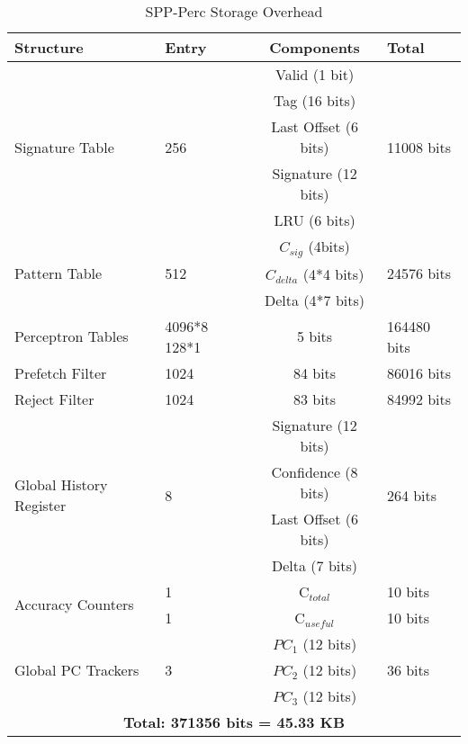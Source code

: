 \begin{table}[]
    \centering
    \begin{tabular}{|p{1.5cm}|p{1cm}|c|p{1.5cm}|}
    \hline
        \textbf{Structure} &
        \textbf{Entry} &
        \textbf{Components} &
        \textbf{Total} \\
    \hline
        \multirow{5}{1.5cm}{Signature Table} & \multirow{5}{1.5cm}{256} & Valid (1 bit) & \multirow{5}{1cm}{11008  bits}\\
        & & Tag (16 bits) &\\
        & & Last Offset (6 bits) &\\  
        & & Signature (12 bits) &\\
        & & LRU (6 bits) &\\
    \hline
        \multirow{3}{1.5cm}{Pattern Table} & \multirow{3}{1.5cm}{512} & $C_{sig}$ (4bits) &\multirow{3}{1cm}{24576 bits}\\
        & & $C_{delta}$ (4*4 bits) &\\
        & & Delta (4*7 bits) &\\
    \hline
        \multirow{3}{1.5cm}{Perceptron Tables} & \multirow{3}{1.5cm}{4096*8 128*1} & \multirow{3}{1.5cm}{5 bits} & \multirow{3}{1.5cm}{164480 bits}\\
        & & &\\
        & & &\\
    \hline
        \multirow{2}{1.5cm}{Prefetch Filter \footnotemark[1]} & \multirow{2}{1.5cm}{1024} & \multirow{2}{1.5cm}{84 bits} & \multirow{2}{1.5cm}{86016 bits}\\
        & & &\\
    \hline
     \multirow{2}{1.5cm}{Reject Filter \footnotemark[2]} & \multirow{2}{1.5cm}{1024} & \multirow{2}{1.5cm}{83 bits} & \multirow{2}{1.5cm}{84992 bits}\\
        & & &\\
    \hline
        \multirow{4}{1.5cm}{Global History Register} & \multirow{4}{1.5cm}{8} & Signature (12 bits) & \multirow{4}{1.5cm}{264 bits}\\
        & & Confidence (8 bits) & \\
        & & Last Offset (6 bits) & \\
        & & Delta (7 bits) & \\
    \hline
        \multirow{2}{1.5cm}{Accuracy Counters} & 1 & C$_{total}$ & 10 bits\\
        & 1 & C$_{useful}$ & 10 bits\\
    \hline
        \multirow{3}{1.5cm}{Global PC Trackers} & \multirow{3}{1cm}{3} & $PC_1$ (12 bits)& \multirow{3}{1.cm}{36 bits}\\
        & & $PC_2$ (12 bits) &\\
        & & $PC_3$ (12 bits) &\\
    \hline
        \multicolumn{4}{|c|}{\textbf{Total: 371356 bits = 45.33 KB}}\\
    \hline
    \end{tabular}
    \caption{SPP-Perc Storage Overhead}
    \label{tab:SPPPerc_overhead}
\end{table}
